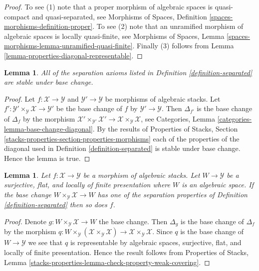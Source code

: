 \documentclass{stacks-project}
\theoremstyle{plain}
\newtheorem{lemma}[subsection]{Lemma}
\theoremstyle{definition}
\theoremstyle{remark}
\numberwithin{equation}{subsection}
\begin{document}
\begin{proof}
To see (1) note that a proper morphism of algebraic spaces is quasi-compact
and quasi-separated, see
Morphisms of Spaces, Definition \ref{spaces-morphisms-definition-proper}.
To see (2) note that an unramified morphism of algebraic spaces is locally
quasi-finite, see
Morphisms of Spaces, Lemma
\ref{spaces-morphisms-lemma-unramified-quasi-finite}.
Finally (3) follows from Lemma \ref{lemma-properties-diagonal-representable}.
\end{proof}

\begin{lemma}
\label{lemma-base-change-separated}
All of the separation axioms listed in
Definition \ref{definition-separated}
are stable under base change.
\end{lemma}

\begin{proof}
Let $f : \mathcal{X} \to \mathcal{Y}$ and
$\mathcal{Y}' \to \mathcal{Y}$ be morphisms of algebraic stacks.
Let $f' : \mathcal{Y}' \times_\mathcal{Y} \mathcal{X} \to \mathcal{Y}'$
be the base change of $f$ by $\mathcal{Y}' \to \mathcal{Y}$.
Then $\Delta_{f'}$ is the base change of $\Delta_f$ by the morphism
$\mathcal{X}' \times_{\mathcal{Y}'} \mathcal{X}' \to
\mathcal{X} \times_\mathcal{Y} \mathcal{X}$, see
Categories, Lemma \ref{categories-lemma-base-change-diagonal}.
By the results of
Properties of Stacks,
Section \ref{stacks-properties-section-properties-morphisms}
each of the properties of the diagonal used in
Definition \ref{definition-separated}
is stable under base change. Hence the lemma is true.
\end{proof}

\begin{lemma}
\label{lemma-check-separated-covering}
Let $f : \mathcal{X} \to \mathcal{Y}$ be a morphism of algebraic stacks.
Let $W \to \mathcal{Y}$ be a surjective, flat, and locally of finite
presentation where $W$ is an algebraic space. If the base change
$W \times_\mathcal{Y} \mathcal{X} \to W$ has one of the separation properties
of Definition \ref{definition-separated}
then so does $f$.
\end{lemma}

\begin{proof}
Denote $g : W \times_\mathcal{Y} \mathcal{X} \to W$ the base change.
Then $\Delta_g$ is the base change of $\Delta_f$ by the morphism
$q : W \times_\mathcal{Y} (\mathcal{X} \times_\mathcal{Y} \mathcal{X})
\to \mathcal{X} \times_\mathcal{Y} \mathcal{X}$. Since $q$ is the base
change of $W \to \mathcal{Y}$ we see that $q$ is representable by algebraic
spaces, surjective, flat, and locally of finite presentation. Hence the
result follows from
Properties of Stacks, Lemma
\ref{stacks-properties-lemma-check-property-weak-covering}.
\end{proof}
\end{document}

